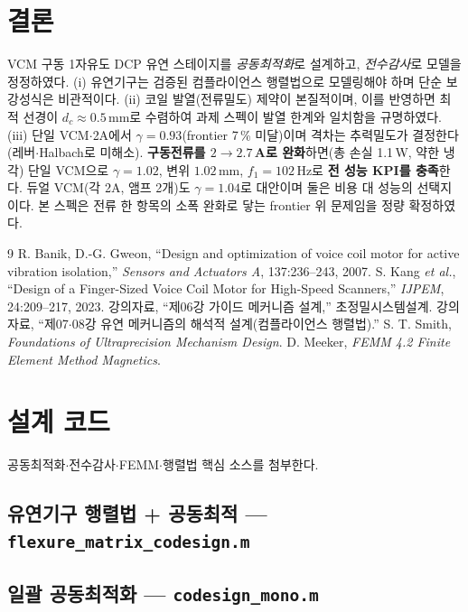 \documentclass[10pt,twocolumn,letterpaper]{article}
\begin{document}
\section{결론}
VCM 구동 1자유도 DCP 유연 스테이지를 \emph{공동최적화}로 설계하고, \emph{전수감사}로 모델을 정정하였다. (i) 유연기구는 검증된 컴플라이언스 행렬법으로 모델링해야 하며 단순 보 강성식은 비관적이다. (ii) 코일 발열(전류밀도) 제약이 본질적이며, 이를 반영하면 최적 선경이 $d_c\approx0.5$\,mm로 수렴하여 과제 스펙이 발열 한계와 일치함을 규명하였다. (iii) 단일 VCM$\cdot$2A에서 $\gamma=0.93$(frontier 7\,\% 미달)이며 격차는 추력밀도가 결정한다(레버$\cdot$Halbach로 미해소). \textbf{구동전류를 $2\to2.7$\,A로 완화}하면(총 손실 1.1\,W, 약한 냉각) 단일 VCM으로 $\gamma=1.02$, 변위 $1.02$\,mm, $f_1=102$\,Hz로 \textbf{전 성능 KPI를 충족}한다. 듀얼 VCM(각 2A, 앰프 2개)도 $\gamma=1.04$로 대안이며 둘은 비용 대 성능의 선택지이다. 본 스펙은 전류 한 항목의 소폭 완화로 닿는 frontier 위 문제임을 정량 확정하였다.

{\small
\begin{thebibliography}{9}
 R. Banik, D.-G. Gweon, ``Design and optimization of voice coil motor for active vibration isolation,'' \emph{Sensors and Actuators A}, 137:236--243, 2007.
 S. Kang \emph{et al.}, ``Design of a Finger-Sized Voice Coil Motor for High-Speed Scanners,'' \emph{IJPEM}, 24:209--217, 2023.
 강의자료, ``제06강 가이드 메커니즘 설계,'' 초정밀시스템설계.
 강의자료, ``제07$\cdot$08강 유연 메커니즘의 해석적 설계(컴플라이언스 행렬법).''
 S. T. Smith, \emph{Foundations of Ultraprecision Mechanism Design}.
 D. Meeker, \emph{FEMM 4.2 Finite Element Method Magnetics}.
\end{thebibliography}
}

\onecolumn
\appendix
\section{설계 코드}
공동최적화$\cdot$전수감사$\cdot$FEMM$\cdot$행렬법 핵심 소스를 첨부한다.

\subsection{유연기구 행렬법 + 공동최적 — \texttt{flexure\_matrix\_codesign.m}}

\subsection{일괄 공동최적화 — \texttt{codesign\_mono.m}}

\end{document}
